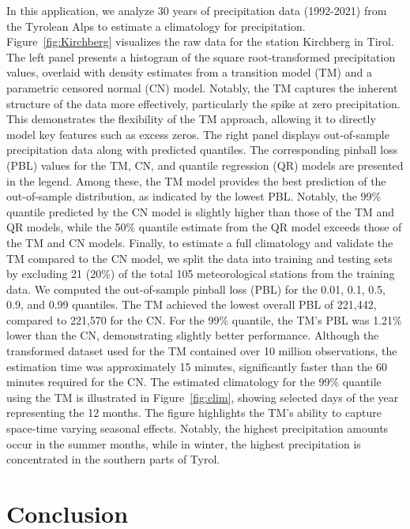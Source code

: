 \documentclass[english,a4paper,11pt]{article}
\begin{document}
In this application, we analyze 30 years of precipitation data (1992-2021)
from the Tyrolean Alps to estimate a 
climatology for precipitation. Figure~\ref{fig:Kirchberg} visualizes the raw data for the station 
Kirchberg in Tirol. The left panel presents a histogram of the square root-transformed precipitation 
values, overlaid with density estimates from a transition model (TM) and a parametric
censored normal (CN) model. Notably, the TM captures the inherent structure of the data more effectively, 
particularly the spike at zero precipitation. This demonstrates the flexibility of the TM approach, 
allowing it to directly model key features such as excess zeros.
The right panel displays out-of-sample precipitation data along with predicted quantiles. The 
corresponding pinball loss (PBL) values for the TM, CN, and quantile regression (QR) models are 
presented in the legend. Among these, the TM model provides the best prediction of the
out-of-sample distribution, as indicated by the lowest PBL. Notably, the 99\% quantile
predicted by the CN model is slightly higher than those of the TM and QR models, while
the 50\% quantile estimate from the QR model exceeds those of the TM and CN models.
Finally, to estimate a full climatology and validate the TM compared to the CN model, we split 
the data into training and testing sets by excluding 21 (20\%) of the total 105 meteorological 
stations from the training data. We computed the out-of-sample pinball loss (PBL) for the 0.01, 
0.1, 0.5, 0.9, and 0.99 quantiles. The TM achieved the lowest overall PBL of 221,442, compared 
to 221,570 for the CN. For the 99\% quantile, the TM's PBL was 1.21\% lower than the CN, 
demonstrating slightly better performance.
Although the transformed dataset used for the TM contained over 10 million observations, the 
estimation time was approximately 15 minutes, significantly faster than the 60 minutes required 
for the CN. The estimated climatology for the 99\% quantile using the TM is illustrated in 
Figure~\ref{fig:clim}, showing selected days of the year representing the 12 months. The figure 
highlights the TM's ability to capture space-time varying seasonal effects. Notably, the
highest precipitation amounts occur in the summer months, while in winter, the highest 
precipitation is concentrated in the southern parts of Tyrol.

\section{Conclusion} \label{sec:conclusion}
\end{document}
